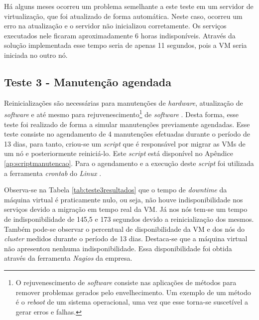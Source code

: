 Há alguns meses ocorreu um problema semelhante a este teste em um servidor de virtualização, que foi atualizado de forma automática. Neste caso, 
ocorreu um erro na atualização e o servidor não inicializou corretamente. Os serviços executados nele ficaram aproximadamente 
6 horas indisponíveis. Através da solução implementada esse tempo seria de apenas 11 segundos, pois a \ac{VM} seria iniciada no outro nó. 

\subsection{Teste 3 - Manutenção agendada}


Reinicializações são necessárias para manutenções de \textit{hardware}, atualização de \textit{software} e até mesmo para 
rejuvenescimento\footnote{O rejuvenescimento de \textit{software} consiste nas aplicações de métodos para remover problemas gerados pelo 
envelhecimento. Um exemplo de um método é o \textit{reboot} de um sistema operacional, uma vez que esse torna-se suscetível a gerar erros e 
falhas.} de \textit{software} \cite{melo2014}. Desta forma, esse teste foi realizado de forma a simular manutenções previamente agendadas.
Esse teste consiste no agendamento de 4 manutenções efetuadas durante o período de 13 dias, para tanto, criou-se um \textit{script} que é 
responsável por migrar as \acp{VM} de um nó e posteriormente reiniciá-lo. Este \textit{script} está disponível no Apêndice 
\ref{ap:scriptmanutencao}. Para o agendamento e a execução deste \textit{script} foi utilizada a ferramenta \textit{crontab} do \textit{Linux}
\cite{neves2008}. 

Observa-se na Tabela \ref{tab:teste3resultados} que o tempo de \textit{downtime} da máquina virtual é praticamente nulo, ou seja, 
não houve indisponibilidade nos serviços devido a migração em tempo real da \ac{VM}. 
Já nos nós tem-se um tempo de indisponibilidade de 145,5 e 173 segundos devido a reinicialização dos mesmos.
Também pode-se observar o percentual de disponibilidade da \ac{VM} e dos nós do \textit{cluster} medidos durante o período de 13 dias.
Destaca-se que a máquina virtual não apresentou nenhuma indisponibilidade. Essa disponibilidade foi obtida através da ferramenta 
\textit{Nagios} \cite{nagios} da empresa.

